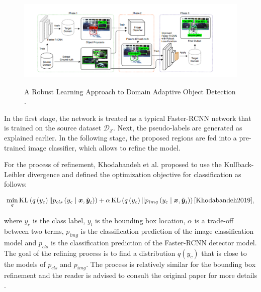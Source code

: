 \begin{figure}[htb]
	\begin{center}
		\includegraphics[width=16cm]{./robust.png}
	\end{center}
	\caption{A Robust Learning Approach to Domain Adaptive Object Detection \cite{Khodabandeh2019}.}
	\begin{center}
		\label{robust}
	\end{center}
\end{figure}
\FloatBarrier

In the first stage, the network is treated as a typical Faster-RCNN network that is trained on the source dataset $\mathcal{D_S}$. Next, the pseudo-labels are generated as explained earlier. In the following stage, the proposed regions are fed into a pre-trained image classifier, which allows to refine the model.

For the process of refinement, Khodabandeh et al. proposed to use the Kullback-Leibler divergence and defined the optimization objective for classification as follows: 

\begin{equation}
\min _{q} \operatorname{KL}\left(q\left(y_{c}\right) \| p_{c l s}\left(y_{c} \mid \boldsymbol{x}, \tilde{\boldsymbol{y}}_{l}\right)\right)+\alpha \operatorname{KL}\left(q\left(y_{c}\right)|| p_{i m g}\left(y_{c} \mid \boldsymbol{x}, \tilde{\boldsymbol{y}}_{l}\right)\right)
\label{KL_DV} 
\cite{Khodabandeh2019},
\end{equation}

where $y_c$ is the class label, $y_l$ is the bounding box location, $\alpha$ is a trade-off between two terms,  $p_{img}$ is the classification prediction of the image classification model and $p_{cls}$ is the classification prediction of the Faster-RCNN detector model. The goal of the refining process is to find a distribution $q(y_c)$ that is close to the models of $p_{cls}$ and $p_{img}$. The process is relatively similar for the bounding box refinement and the reader is advised to consult the original paper for more details \cite{Khodabandeh2019}.  

